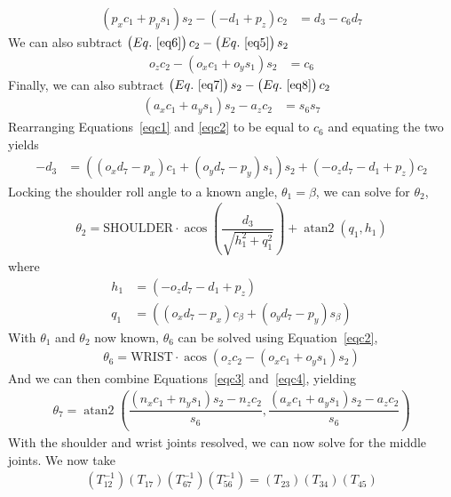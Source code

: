 \documentclass{article}
\DeclareMathOperator{\atantwo}{atan2}
\DeclareMathOperator{\acos}{acos}
\begin{document}
\begin{align}
\left(p_{x} c_1 + p_{y} s_1 \right) s_2 - \left(- d_{1} + p_{z} \right) c_2 &= d_3 - c_6 d_7 \label{eqc1}
\end{align}
We can also subtract $\left(Eq.~\ref{eq6} \right) c_2 - \left(Eq.~\ref{eq5} \right) s_2$
\begin{align}
o_{z} c_2 - \left( o_{x} c_1 + o_{y} s_1 \right) s_2 &= c_{6} \label{eqc2}
\end{align}
Finally, we can also subtract $\left(Eq.~\ref{eq7} \right) s_2 - \left(Eq.~\ref{eq8} \right) c_2$
\begin{align}
\left(a_{x} c_1 + a_{y} s_1\right) s_2 - a_{z} c_2 &= s_{6} s_{7} \label{eqc4}
\end{align}
Rearranging Equations~\ref{eqc1} and \ref{eqc2} to be equal to $c_6$ and equating the two yields
\begin{align}
-d_3 &= \left( \left( o_{x} d_7 - p_{x} \right) c_1 + \left( o_{y} d_7 - p_{y} \right) s_1 \right) s_2 + \left(-o_{z} d_7 - d_{1} + p_{z} \right) c_2
\end{align}
Locking the shoulder roll angle to a known angle, $\boxed{\theta_1 = \beta}$, we can solve for $\theta_2$,
\begin{align}
\boxed{\theta_2 = \mbox{SHOULDER} \cdot \acos \left( \dfrac{d_3}{\sqrt{h_1^2 + q_1^2}} \right) + \atantwo(q_1,h_1)}
\end{align}
where
\begin{align}
h_1 &= \left(-o_{z} d_7 - d_{1} + p_{z} \right) \\
q_1 &= \left( \left( o_{x} d_7 - p_{x} \right) c_{\beta} + \left( o_{y} d_7 - p_{y} \right) s_{\beta} \right)
\end{align}
With $\theta_1$ and $\theta_2$ now known, $\theta_6$ can be solved using Equation~\ref{eqc2},
\begin{align}
\boxed{\theta_6 = \mbox{WRIST} \cdot \acos \left(o_{z} c_2 - \left( o_{x} c_1 + o_{y} s_1 \right) s_2 \right)}
\end{align}
And we can then combine Equations~\ref{eqc3} and~\ref{eqc4}, yielding
\begin{align}
\boxed{\theta_7 = \atantwo \left( \dfrac{\left(n_{x} c_1 + n_{y} s_1\right) s_2 - n_{z} c_2}{s_6},
                                  \dfrac{\left(a_{x} c_1 + a_{y} s_1\right) s_2 - a_{z} c_2}{s_6}\right)}
\end{align}
With the shoulder and wrist joints resolved, we can now solve for the middle joints. We now take
\begin{align*}
\left(T_{12}^{-1} \right) \left(T_{17}\right) \left(T_{67}^{-1}\right) \left(T_{56}^{-1}\right) = \left(T_{23}\right) \left(T_{34}\right) \left(T_{45}\right)
\end{align*}
\end{document}

